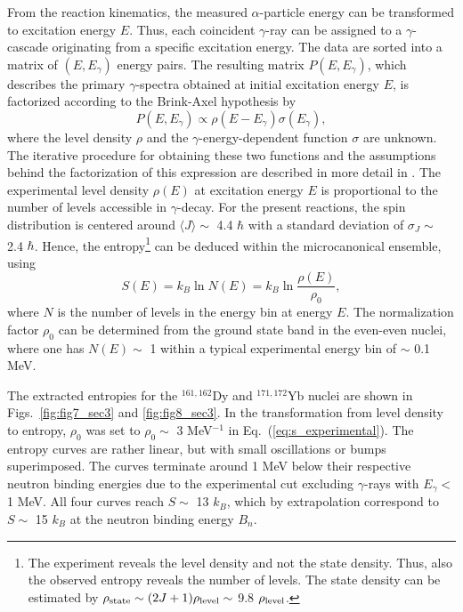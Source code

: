\documentclass[rmp,aps,floatfix]{revtex4}
\begin{document}
From the reaction kinematics, the measured 
$\alpha$-particle energy can be transformed to 
excitation energy $E$. Thus, each coincident $\gamma$-ray can 
be assigned to a $\gamma$-cascade originating from a 
specific excitation energy. The data are sorted into a 
matrix of $(E,E_{\gamma})$ energy pairs. 
The resulting matrix $P(E,E_{\gamma})$, which describes 
the primary $\gamma$-spectra obtained at initial excitation energy 
$E$, is factorized according to the Brink-Axel 
hypothesis \cite{brink_thesis,axel62} by 
\begin{equation}
P(E,E_{\gamma}) \propto \rho (E -E_{\gamma})\sigma (E_{\gamma}), 
\label{eq:firstgamma1}
\end{equation}
where the level density $\rho$ and the $\gamma$-energy-dependent
function $\sigma$ are unknown. The iterative procedure for obtaining
these two functions and 
the assumptions behind the factorization of this expression are 
described in more detail in \cite{oslo1,andreas2000}.
The experimental level density $\rho(E)$ at excitation energy 
$E$ is proportional to the number of levels accessible in 
$\gamma$-decay. For the present reactions, the spin 
distribution is centered around $\langle J\rangle \sim$ 4.4 $\hbar$ 
with a standard deviation of $\sigma_J \sim$ 2.4 $\hbar$. 
Hence, the entropy\footnote{The experiment reveals 
the level density and not the state density. Thus, also the 
observed entropy reveals the number of levels. The state density can 
be estimated by $\rho_{\rm state} 
\sim (2J+1)\rho_{\rm level} \sim$ 9.8 $\rho_{\rm level}$.} can 
be deduced within the microcanonical ensemble, using 
\begin{equation}
S(E) = k_B \ln N(E) = k_B \ln \frac{\rho(E)}{\rho_0},
\label{eq:s_experimental}
\end{equation}
where $N$ is the number of levels in the 
energy bin at energy $E$. The normalization factor 
$\rho_0$ can be determined from the ground state band 
in the even-even nuclei, where one  has $N(E) \sim$ 1 within a 
typical experimental energy bin of $\sim$ 0.1 MeV. 

The extracted entropies for the $^{161,162}$Dy and $^{171,172}$Yb 
nuclei are shown in Figs.\ \ref{fig:fig7_sec3} and \ref{fig:fig8_sec3}. 
In the transformation from level density to entropy, $\rho_0$ was set to
$\rho_0 \sim$ 3 MeV$^{-1}$ in
Eq.~(\ref{eq:s_experimental}). The entropy curves 
are rather linear, but with small oscillations or bumps 
superimposed. The curves terminate around 1 MeV below 
their respective neutron binding energies due to the 
experimental cut excluding $\gamma$-rays with $E_{\gamma} <$ 1 MeV. 
All four curves reach $S \sim$ 13 $k_B$, which by extrapolation correspond 
to $S \sim$ 15 $k_B$ at the neutron binding energy $B_n$. 
\end{document}
